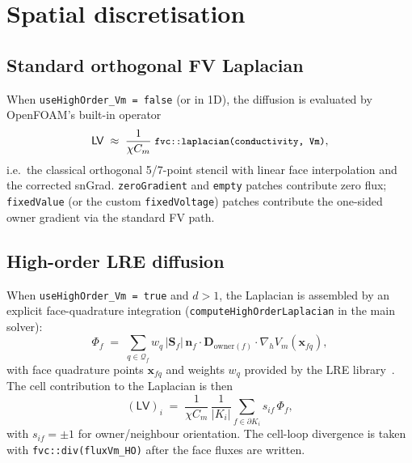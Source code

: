 \documentclass[11pt,a4paper]{article}
\newcommand{\Vm}{V_{m}}
\newcommand{\Dten}{\mathbf{D}}
\newcommand{\grad}{\nabla}
\newcommand{\Lop}{\mathsf{L}}
\newcommand{\code}[1]{\texttt{\small #1}}
\begin{document}
\section{Spatial discretisation}
\label{sec:space}

\subsection{Standard orthogonal FV Laplacian}
\label{sec:stdFV}

When \code{useHighOrder\_Vm = false} (or in 1D), the diffusion is
evaluated by OpenFOAM's built-in operator
\begin{equation}
  \Lop \mathsf{V}
   \;\approx\;
   \frac{1}{\chi C_{m}}\;
   \text{\code{fvc::laplacian(conductivity, Vm)}},
\end{equation}
i.e.\ the classical orthogonal 5/7-point stencil with linear face
interpolation and the corrected snGrad. \code{zeroGradient} and
\code{empty} patches contribute zero flux; \code{fixedValue} (or the
custom \code{fixedVoltage}) patches contribute the one-sided owner
gradient via the standard FV path.

\subsection{High-order LRE diffusion}
\label{sec:hoVm}

When \code{useHighOrder\_Vm = true} and $d > 1$, the Laplacian is
assembled by an explicit face-quadrature integration
(\code{computeHighOrderLaplacian} in the main solver):
\begin{equation}
  \Phi_{f}
   \;=\;
   \sum_{q \in \mathcal{Q}_{f}}
       w_{q}\, \lvert \mathbf{S}_{f} \rvert\,
       \mathbf{n}_{f} \cdot \Dten_{\text{owner}(f)} \cdot
       \grad_{\!h}\Vm(\mathbf{x}_{fq}),
\end{equation}
with face quadrature points $\mathbf{x}_{fq}$ and weights $w_{q}$
provided by the LRE library~\cite{cardiff2018s4f}. The cell
contribution to the Laplacian is then
\begin{equation}
  (\Lop \mathsf{V})_{i}
   \;=\;
   \frac{1}{\chi C_{m}}\,\frac{1}{|K_{i}|}
   \sum_{f \in \partial K_{i}} s_{if}\,\Phi_{f},
\end{equation}
with $s_{if} = \pm 1$ for owner/neighbour orientation. The cell-loop
divergence is taken with \code{fvc::div(fluxVm\_HO)} after the face
fluxes are written.
\end{document}
